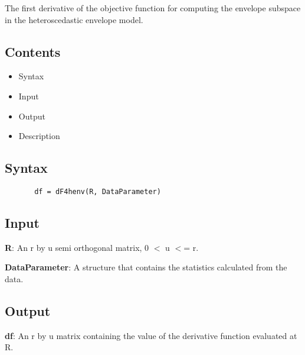 \documentclass[a4paper,11pt,openany]{memoir}
\begin{document}
\begin{par}
The first derivative of the objective function for computing the envelope subspace in the heteroscedastic envelope model.
\end{par} \vspace{1em}

\subsection*{Contents}

\begin{itemize}
\setlength{\itemsep}{-1ex}
   \item Syntax
   \item Input
   \item Output
   \item Description
\end{itemize}


\subsection*{Syntax}


\begin{verbatim}       df = dF4henv(R, DataParameter)\end{verbatim}
    

\subsection*{Input}

\begin{par}
\textbf{R}: An r by u semi orthogonal matrix, 0 \ensuremath{<} u \ensuremath{<}= r.
\end{par} \vspace{1em}
\begin{par}
\textbf{DataParameter}: A structure that contains the statistics calculated from the data.
\end{par} \vspace{1em}


\subsection*{Output}

\begin{par}
\textbf{df}: An r by u matrix containing the value of the derivative function evaluated at R.
\end{par} \vspace{1em}
\end{document}
